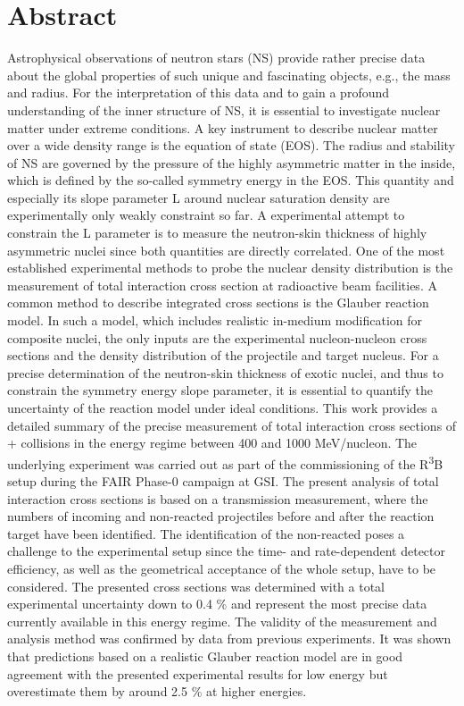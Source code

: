 \thispagestyle{empty}
\section*{Abstract}
Astrophysical observations of neutron stars (NS) provide rather precise data about the global properties of such unique and fascinating objects, e.g., the mass and radius. For the interpretation of this data and to gain a profound understanding of the inner structure of NS, it is essential to investigate nuclear matter under extreme conditions. A key instrument to describe nuclear matter over a wide density range is the equation of state (EOS). The radius and stability of NS are governed by the pressure of the highly asymmetric matter in the inside, which is defined by the so-called symmetry energy in the EOS. This quantity and especially its slope parameter L around nuclear saturation density are experimentally only weakly constraint so far.\newline
A experimental attempt to constrain the L parameter is to measure the neutron-skin thickness of highly asymmetric nuclei since both quantities are directly correlated. One of the most established experimental methods to probe the nuclear density distribution is the measurement of total interaction cross section at radioactive beam facilities. A common method to describe integrated cross sections is the Glauber reaction model. In such a model, which includes realistic in-medium modification for composite nuclei, the only inputs are the experimental nucleon-nucleon cross sections and the density distribution of the projectile and target nucleus.\newline
For a precise determination of the neutron-skin thickness of exotic nuclei, and thus to constrain the symmetry energy slope parameter, it is essential to quantify the uncertainty of the reaction model under ideal conditions. \newline
This work provides a detailed summary of the precise measurement of total interaction cross sections of + collisions in the energy regime between 400 and 1000 MeV/nucleon. The underlying experiment was carried out as part of the commissioning of the R\textsuperscript{3}B setup during the FAIR Phase-0 campaign at GSI. The present analysis of total interaction cross sections is based on a transmission measurement, where the numbers of incoming and non-reacted projectiles before and after the reaction target have been identified. The identification of the non-reacted  poses a challenge to the experimental setup since the time- and rate-dependent detector efficiency, as well as the geometrical acceptance of the whole setup, have to be considered.\newline
The presented cross sections was determined with a total experimental uncertainty down to 0.4 \% and represent the most precise data currently available in this energy regime. The validity of the measurement and analysis method was confirmed by data from previous experiments. It was shown that predictions based on a realistic Glauber reaction model are in good agreement with the presented experimental results for low energy but overestimate them by around 2.5 \% at higher energies. 